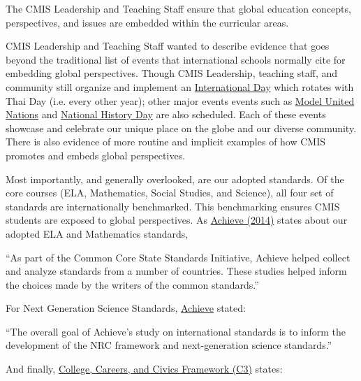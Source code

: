 \documentclass{report}
\begin{document}
\begin{findings}
The CMIS Leadership and Teaching Staff ensure that global education concepts, perspectives, and issues are embedded within the curricular areas.

CMIS Leadership and Teaching Staff wanted to describe evidence that goes beyond the traditional list of events that international schools normally cite for embedding global perspectives. Though CMIS Leadership, teaching staff, and community still organize and implement an \href{https://drive.google.com/drive/folders/0B0TYmzaZNi3fbnhzMzNNT3hKNm8?usp=sharing}{International Day} which rotates with Thai Day (i.e. every other year); other major events events such as \href{https://drive.google.com/drive/folders/0B0TYmzaZNi3fdlJuWDFxb0NpemM?usp=sharing}{Model United Nations} and \href{https://drive.google.com/drive/folders/0B0TYmzaZNi3fUkdpR1hLaDVaekk?usp=sharing}{National History Day} are also scheduled. Each of these events showcase and celebrate our unique place on the globe and our diverse community. There is also evidence of more routine and implicit examples of how CMIS promotes and embeds global perspectives. 


Most importantly, and generally overlooked, are our adopted standards. Of the core courses (ELA, Mathematics, Social Studies, and Science), all four set of standards are internationally benchmarked. This benchmarking  ensures CMIS students are exposed to global perspectives. As \href{https://docs.google.com/a/cmis.ac.th/document/d/1ApZ_fARdmcK_9fEeb8uoWyGa50572P8z-sM9JeTQygQ/edit?usp=sharing}{Achieve (2014)} states about our adopted ELA and Mathematics standards, 

“As part of the Common Core State Standards Initiative, Achieve helped collect and analyze standards from a number of countries. These studies helped inform the choices made by the writers of the common standards.”

For Next Generation Science Standards, \href{https://docs.google.com/a/cmis.ac.th/document/d/1ApZ_fARdmcK_9fEeb8uoWyGa50572P8z-sM9JeTQygQ/edit?usp=sharing}{Achieve} stated: 

“The overall goal of Achieve’s study on international standards is to inform the development of the NRC framework and next-generation science standards.”

And finally, \href{https://docs.google.com/a/cmis.ac.th/document/d/1ApZ_fARdmcK_9fEeb8uoWyGa50572P8z-sM9JeTQygQ/edit?usp=sharing}{College, Careers, and Civics Framework (C3)} states: 


\end{findings}
\end{document}
